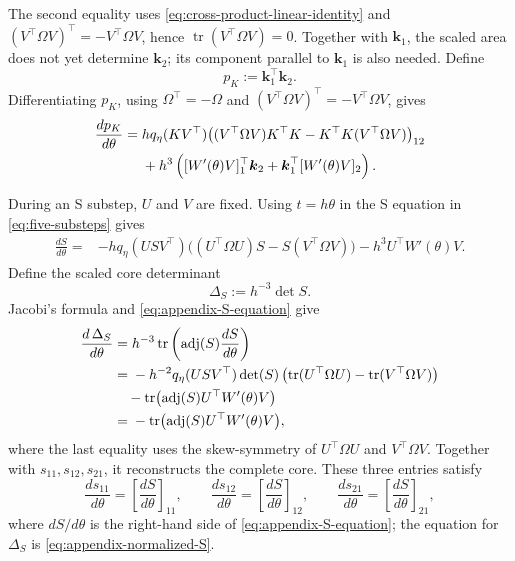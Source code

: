 \documentclass[]{article}
\numberwithin{equation}{section}
\theoremstyle{plain}
\theoremstyle{remark}
\begin{document}
The second equality uses
\eqref{eq:cross-product-linear-identity} and
$(V^\top\Omega V)^\top=-V^\top\Omega V$, hence
$\operatorname{tr}(V^\top\Omega V)=0$.
Together with \(\boldsymbol k_1\), the scaled area does not yet
determine \(\boldsymbol k_2\); its component parallel to
\(\boldsymbol k_1\) is also needed.  Define
\begin{equation}\label{eq:appendix-K-inner-product}
 p_K:=\boldsymbol k_1^\top\boldsymbol k_2.
\end{equation}
Differentiating \(p_K\), using \(\Omega^\top=-\Omega\) and
\((V^\top\Omega V)^\top=-V^\top\Omega V\), gives
\begin{align}
 \frac{dp_K}{d\theta}
 ={}&hq_\eta(KV^\top)
 \bigl((V^\top\Omega V)K^\top K
       -K^\top K(V^\top\Omega V)\bigr)_{12}\notag\\
 &+h^3\left(
 [W'(\theta)V]_1^\top\boldsymbol k_2
 +\boldsymbol k_1^\top[W'(\theta)V]_2\right).
 \label{eq:appendix-normalized-K-parallel}
\end{align}

During an S substep, $U$ and $V$ are fixed.  Using
\(t=h\theta\) in the S equation in
\eqref{eq:five-substeps} gives
\begin{align}
 \frac{dS}{d\theta}
 ={}&-hq_\eta(USV^\top)
 \bigl((U^\top\Omega U)S-S(V^\top\Omega V)\bigr)
 -h^3U^\top W'(\theta)V.
 \label{eq:appendix-S-equation}
\end{align}
Define the scaled core determinant
\begin{equation}\label{eq:appendix-core-determinant-definition}
 \Delta_S:=h^{-3}\det S.
\end{equation}
Jacobi's formula and \eqref{eq:appendix-S-equation} give
\begin{align}
 \frac{d\,\Delta_S}{d\theta}
 &={}h^{-3}\operatorname{tr}\left(
 \operatorname{adj}(S)\frac{dS}{d\theta}\right)\notag\\
 &={}-h^{-2}q_\eta(USV^\top)\det(S)
 \left(\operatorname{tr}(U^\top\Omega U)
 -\operatorname{tr}(V^\top\Omega V)\right)\notag\\
 &\quad-\operatorname{tr}\bigl(
 \operatorname{adj}(S)U^\top W'(\theta)V\bigr)\notag\\
 &={}-\operatorname{tr}\bigl(
 \operatorname{adj}(S)U^\top W'(\theta)V\bigr),
 \label{eq:appendix-normalized-S}
\end{align}
where the last equality uses the skew-symmetry of
$U^\top\Omega U$ and $V^\top\Omega V$.
Together with \(s_{11},s_{12},s_{21}\), it reconstructs the complete
core.  These three entries satisfy
\begin{equation}\label{eq:appendix-core-coordinate-odes}
 \frac{ds_{11}}{d\theta}=\left[\frac{dS}{d\theta}\right]_{11},
 \qquad
 \frac{ds_{12}}{d\theta}=\left[\frac{dS}{d\theta}\right]_{12},
 \qquad
 \frac{ds_{21}}{d\theta}=\left[\frac{dS}{d\theta}\right]_{21},
\end{equation}
where \(dS/d\theta\) is the right-hand side of
\eqref{eq:appendix-S-equation}; the equation for \(\Delta_S\) is
\eqref{eq:appendix-normalized-S}.
\end{document}
